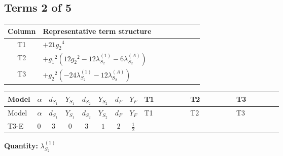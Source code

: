 \documentclass[8pt]{article}
\begin{document}
\begin{landscape}
\subsection*{Terms 2 of 5}
\begin{center}
\begin{tabular}{@{}c >{\raggedright\arraybackslash}p{0.82\linewidth}@{}}
\toprule
Column & Representative term structure \\
\midrule
T1 & \(\displaystyle +21 {g_2}^4\) \\
\midrule
T2 & \(\displaystyle +{g_1}^2 \left(12 {g_2}^2-12 {\lambda_{S_2}^{(1)}}-6 {\lambda_{S_2}^{(A)}}\right)\) \\
\midrule
T3 & \(\displaystyle +{g_2}^2 (-24 {\lambda_{S_2}^{(1)}}-12 {\lambda_{S_2}^{(A)}})\) \\
\midrule
\bottomrule
\end{tabular}
\end{center}
\smallskip
\tiny
\begin{longtable}{@{}llcccccc >{\raggedright\arraybackslash}p{0.21\linewidth} >{\raggedright\arraybackslash}p{0.21\linewidth} >{\raggedright\arraybackslash}p{0.21\linewidth}@{}}
\toprule
Model & $\alpha$ & $d_{S_1}$ & $Y_{S_1}$ & $d_{S_2}$ & $Y_{S_2}$ & $d_F$ & $Y_F$ & T1 & T2 & T3 \\
\midrule
\endfirsthead
\toprule
Model & $\alpha$ & $d_{S_1}$ & $Y_{S_1}$ & $d_{S_2}$ & $Y_{S_2}$ & $d_F$ & $Y_F$ & T1 & T2 & T3 \\
\midrule
\endhead
T3-E & $0$ & $3$ & $0$ & $3$ & $1$ & $2$ & $\frac{1}{2}$ & \scriptsize\adjustbox{max width=\linewidth}{$\begin{gathered} +21 {g_2}^4\end{gathered}$} & \scriptsize\adjustbox{max width=\linewidth}{$\begin{gathered} +{g_1}^2 \left(12 {g_2}^2-12 {\lambda_{S_2}^{(1)}}-6 {\lambda_{S_2}^{(A)}}\right)\end{gathered}$} & \scriptsize\adjustbox{max width=\linewidth}{$\begin{gathered} +{g_2}^2 (-24 {\lambda_{S_2}^{(1)}}-12 {\lambda_{S_2}^{(A)}})\end{gathered}$} \\
\midrule
\bottomrule
\end{longtable}
\clearpage
\noindent\textbf{Quantity: }$\lambda_{S_2}^{(1)}$\par\smallskip

\end{landscape}
\end{document}
